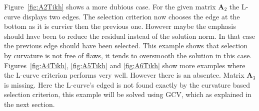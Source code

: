 Figure~\ref{fig:A2Tikh} shows a more dubious case. For the given matrix $\mathbf{A}_2$ the L-curve displays two edges. The selection criterion now chooses the edge at the bottom as it is curvier then the previous one. However maybe the emphasis should have been to reduce the residual instead of the solution norm. In that case the previous edge should have been selected. This example shows that selection by curvature is not free of flaws, it tends to oversmooth the solution in this case. Figures~\ref{fig:A4Tikh}, \ref{fig:A5Tikh} and \ref{fig:A6Tikh} show more examples where the L-curve criterion performs very well. However there is an absentee. Matrix $\mathbf{A}_{3}$ is missing. Here the L-curve's edged is not found exactly by the curvature based selection criterion, this example will be solved using GCV, which as explained in the next section.

